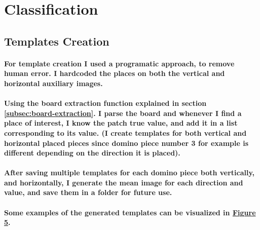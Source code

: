 \documentclass[12pt]{article}
\begin{document}
    \section{Classification}\label{sec:classification}

    \subsection{Templates Creation}\label{subsec:templates-creation}

    \paragraph{For template creation I used a programatic approach, to remove human error. I hardcoded the places on both the vertical and horizontal auxiliary images.}

    \paragraph{Using the board extraction function explained in section \ref{subsec:board-extraction}. I parse the board and whenever I find a place of interest, I know the patch true value, and add it in a list corresponding to its value. (I create templates for both vertical and horizontal placed pieces since domino piece number 3 for example is different depending on the direction it is placed).}

    \paragraph{After saving multiple templates for each domino piece both vertically, and horizontally, I generate the mean image for each direction and value, and save them in a folder for future use.}

    \paragraph{Some examples of the generated templates can be visualized in \hyperref[fig:templates-creation]{Figure 5}.}
\end{document}
